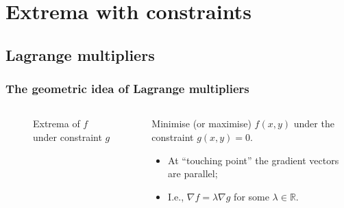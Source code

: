 \documentclass[aspectratio=169,handout]{beamer}
\newcommand{\bR}{\mathbb{R}} %
\begin{document}
\section{Extrema with constraints}

\subsection{Lagrange multipliers}


\begin{frame}
    \frametitle{The geometric idea of Lagrange multipliers}

    \begin{columns}
        \begin{column}{.5\textwidth}
            \begin{figure}
                \noindent{}
                \caption{Extrema of \(f\) under constraint \(g\)}
            \end{figure}

        \end{column}
        \begin{column}{.5\textwidth}
            Minimise (or maximise) \(f(x,y)\) under the constraint \(g(x,y) = 0\).
            \begin{itemize}
                \item At ``touching point'' the gradient vectors are parallel;
                \item I.e., \(\nabla f = \lambda \nabla g\) for some \(\lambda \in \bR\).
            \end{itemize}
        \end{column}
    \end{columns}


\end{frame}
\end{document}
